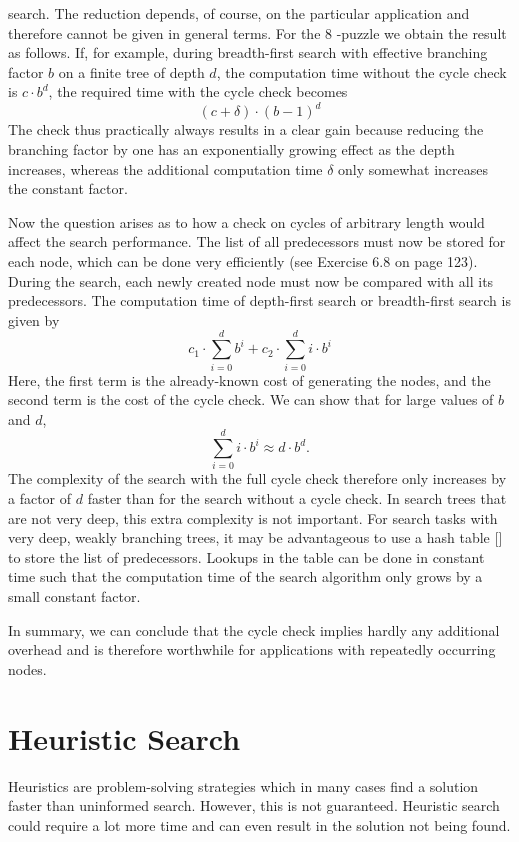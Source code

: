 \documentclass[10pt]{book}
\begin{document}
search. The reduction depends, of course, on the particular application and therefore cannot be given in general terms.
For the 8 -puzzle we obtain the result as follows. If, for example, during breadth-first search with effective branching factor $b$ on a finite tree of depth $d$, the computation time without the cycle check is $c \cdot b^{d}$, the required time with the cycle check becomes
$$
(c+\delta) \cdot(b-1)^{d}
$$
The check thus practically always results in a clear gain because reducing the branching factor by one has an exponentially growing effect as the depth increases, whereas the additional computation time $\delta$ only somewhat increases the constant factor.

Now the question arises as to how a check on cycles of arbitrary length would affect the search performance. The list of all predecessors must now be stored for each node, which can be done very efficiently (see Exercise 6.8 on page 123). During the search, each newly created node must now be compared with all its predecessors. The computation time of depth-first search or breadth-first search is given by
$$
c_{1} \cdot \sum_{i=0}^{d} b^{i}+c_{2} \cdot \sum_{i=0}^{d} i \cdot b^{i}
$$
Here, the first term is the already-known cost of generating the nodes, and the second term is the cost of the cycle check. We can show that for large values of $b$ and $d$,
$$
\sum_{i=0}^{d} i \cdot b^{i} \approx d \cdot b^{d} .
$$
The complexity of the search with the full cycle check therefore only increases by a factor of $d$ faster than for the search without a cycle check. In search trees that are not very deep, this extra complexity is not important. For search tasks with very deep, weakly branching trees, it may be advantageous to use a hash table [\cite{cormen1990introduction}] to store the list of predecessors. Lookups in the table can be done in constant time such that the computation time of the search algorithm only grows by a small constant factor.

In summary, we can conclude that the cycle check implies hardly any additional overhead and is therefore worthwhile for applications with repeatedly occurring nodes.

\section{Heuristic Search}
Heuristics are problem-solving strategies which in many cases find a solution faster than uninformed search. However, this is not guaranteed. Heuristic search could require a lot more time and can even result in the solution not being found.
\end{document}
